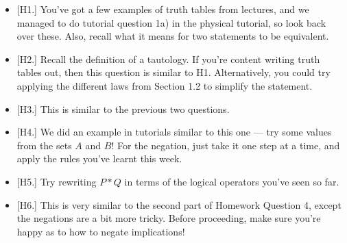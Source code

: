 \documentclass[
  10pt,
  a4paper]{article}
\providecommand{\tightlist}{%
  \setlength{\itemsep}{0pt}\setlength{\parskip}{0pt}}
\theoremstyle{plain}
\theoremstyle{definition}
\theoremstyle{plain}
\theoremstyle{plain}
\theoremstyle{plain}
\theoremstyle{plain}
\theoremstyle{definition}
\theoremstyle{definition}
\newtheorem*{Order Axioms*}{Order Axioms}\newtheorem{Order Axioms}{Order Axioms}[section]
\theoremstyle{remark}
\theoremstyle{remark}
\begin{document}
\begin{itemize}
\tightlist
\item
  {[}H1.{]} You've got a few examples of truth tables from lectures, and we managed to do tutorial question 1a) in the physical tutorial, so look back over these. Also, recall what it means for two statements to be equivalent.
\item
  {[}H2.{]} Recall the definition of a tautology. If you're content writing truth tables out, then this question is similar to H1. Alternatively, you could try applying the different laws from Section 1.2 to simplify the statement.
\item
  {[}H3.{]} This is similar to the previous two questions.
\item
  {[}H4.{]} We did an example in tutorials similar to this one --- try some values from the sets \(A\) and \(B\)! For the negation, just take it one step at a time, and apply the rules you've learnt this week.
\item
  {[}H5.{]} Try rewriting \(P*Q\) in terms of the logical operators you've seen so far.
\item
  {[}H6.{]} This is very similar to the second part of Homework Question 4, except the negations are a bit more tricky. Before proceeding, make sure you're happy as to how to negate implications!
\end{itemize}
\end{document}
